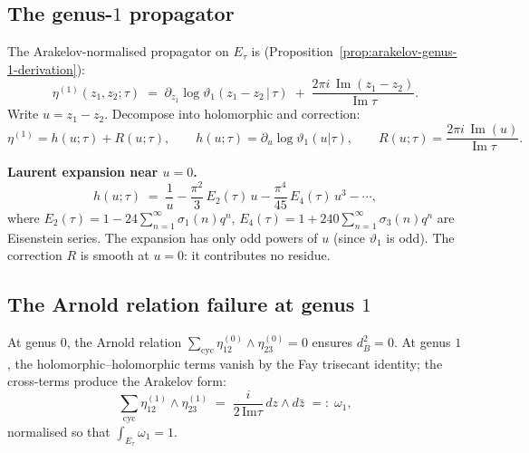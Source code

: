 \documentclass[11pt]{article}
\newcommand{\barB}{\overline{B}}
\begin{document}
\subsection{The genus-$1$ propagator}
\label{subsec:wn-genus1-propagator}

The Arakelov-normalised propagator on $E_\tau$ is
(Proposition~\ref{prop:arakelov-genus-1-derivation}):
\begin{equation}\label{eq:wn-eta-1}
\eta^{(1)}(z_1, z_2;\tau)
\;=\;
\partial_{z_1}\log\vartheta_1(z_1 - z_2 \,|\, \tau)
\;+\;
\frac{2\pi i \,\operatorname{Im}(z_1 - z_2)}
     {\operatorname{Im}\tau}.
\end{equation}
Write $u = z_1 - z_2$.  Decompose into holomorphic and
correction:
\[
\eta^{(1)} = h(u;\tau) + R(u;\tau),
\qquad
h(u;\tau) = \partial_u\log\vartheta_1(u|\tau),
\qquad
R(u;\tau) = \frac{2\pi i\,\operatorname{Im}(u)}
{\operatorname{Im}\tau}.
\]

\noindent
\textbf{Laurent expansion near $u = 0$.}
\begin{equation}\label{eq:wn-laurent}
h(u;\tau)
\;=\;
\frac{1}{u}
- \frac{\pi^2}{3}\,E_2(\tau)\,u
- \frac{\pi^4}{45}\,E_4(\tau)\,u^3
- \cdots,
\end{equation}
where $E_2(\tau) = 1 - 24\sum_{n=1}^\infty \sigma_1(n)q^n$,
$E_4(\tau) = 1 + 240\sum_{n=1}^\infty \sigma_3(n)q^n$ are
Eisenstein series.  The expansion has only odd powers of $u$
(since $\vartheta_1$ is odd).  The correction $R$ is smooth at
$u = 0$: it contributes no residue.

\subsection{The Arnold relation failure at genus $1$}
\label{subsec:wn-arnold-failure}

At genus $0$, the Arnold relation
$\sum_{\mathrm{cyc}}\eta^{(0)}_{12}\wedge\eta^{(0)}_{23} = 0$
ensures $d_{\barB}^2 = 0$.  At genus $1$, the
holomorphic--holomorphic terms vanish by the Fay trisecant
identity; the cross-terms produce the Arakelov form:
\begin{equation}\label{eq:wn-arnold-defect}
\boxed{
\sum_{\mathrm{cyc}}
\eta^{(1)}_{12} \wedge \eta^{(1)}_{23}
\;=\;
\frac{i}{2\,\mathrm{Im}\tau}\,dz \wedge d\bar{z}
\;=:\; \omega_1,
}
\end{equation}
normalised so that $\int_{E_\tau}\omega_1 = 1$.
\end{document}
